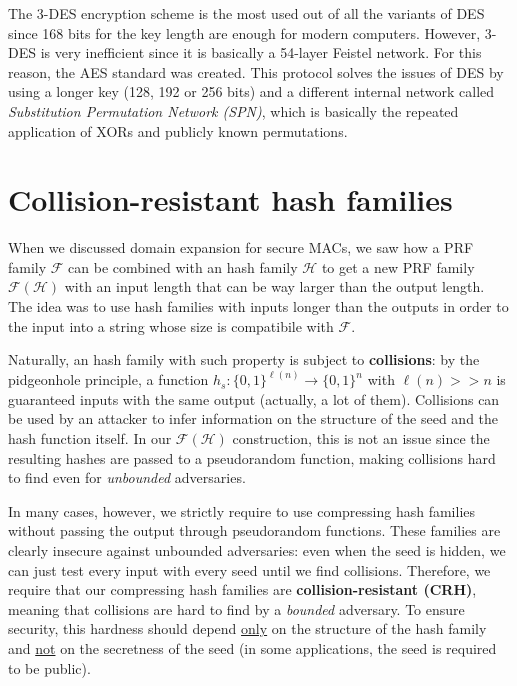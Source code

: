 \documentclass[a4paper, 12pt]{report}
\begin{document}
    The 3-DES encryption scheme is the most used out of all the variants of DES since 168 bits for the key length are enough for modern computers. However, 3-DES is very inefficient since it is basically a 54-layer Feistel network. For this reason, the AES standard was created. This protocol solves the issues of DES by using a longer key (128, 192 or 256 bits) and a different internal network called \textit{Substitution Permutation Network (SPN)}, which is basically the repeated application of XORs and publicly known permutations.

    \section{Collision-resistant hash families}
    
    When we discussed domain expansion for secure MACs, we saw how a PRF family $\mathcal{F}$ can be combined with an hash family $\mathcal{H}$ to get a new PRF family $\mathcal{F}(\mathcal{H})$ with an input length that can be way larger than the output length. The idea was to use hash families with inputs longer than the outputs in order to  the input into a string whose size is compatibile with $\mathcal{F}$.
    
    Naturally, an hash family with such property is subject to \textbf{collisions}: by the pidgeonhole principle, a function $h_s : \{0,1\}^{\ell(n)} \to \{0,1\}^n$ with $\ell(n) >> n$ is guaranteed inputs with the same output (actually, a lot of them). Collisions can be used by an attacker to infer information on the structure of the seed and the hash function itself. In our $\mathcal{F}(\mathcal{H})$ construction, this is not an issue since the resulting hashes are passed to a pseudorandom function, making collisions hard to find even for \textit{unbounded} adversaries.
    
    In many cases, however, we strictly require to use compressing hash families without passing the output through pseudorandom functions. These families are clearly insecure against unbounded adversaries: even when the seed is hidden, we can just test every input with every seed until we find collisions. Therefore, we require that our compressing hash families are \textbf{collision-resistant (CRH)}, meaning that collisions are hard to find by a \textit{bounded} adversary. To ensure security, this hardness should depend \underline{only} on the structure of the hash family and \underline{not} on the secretness of the seed (in some applications, the seed is required to be public).
\end{document}
